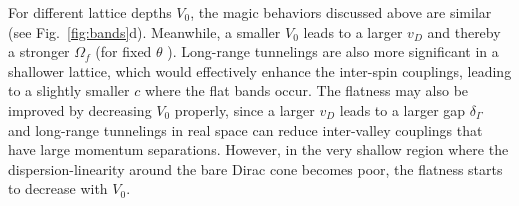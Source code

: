\documentclass[twocolumn,english,prl,floatfix,citeautoscript,nofootinbib]{revtex4}
\begin{document}
For different lattice depths $V_{0}$, the magic behaviors discussed above
are similar (see Fig.~\ref{fig:bands}d). Meanwhile, a smaller $V_{0}$ leads
to a larger $v_{D}$ and thereby a stronger $\Omega _{f}$ (for fixed $\theta $%
). Long-range tunnelings are also more significant in a shallower lattice,
which would effectively enhance the inter-spin couplings, leading to a
slightly smaller $c$ where the flat bands occur. The flatness may also
be improved by decreasing $V_{0}$ properly, since a larger $v_{D}$ leads to
a larger gap $\delta _{\Gamma }$~\cite{PNAS.108.12233,PhysRevB.86.155449}
and long-range tunnelings in real space can reduce inter-valley couplings
that have large momentum separations. However, in the very shallow region
where the dispersion-linearity around the bare Dirac cone becomes poor, the
flatness starts to decrease with $V_{0}$.
\end{document}
